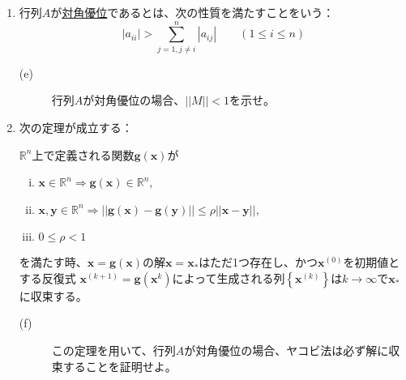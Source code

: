 \begin{enumerate}
\item 行列$A$が\underline{対角優位}であるとは、次の性質を満たすことをいう：
  \begin{equation*}
    |a_{ii}|>\sum_{j=1, j\neq i}^{n}\left|a_{ij}\right|\qquad (1\le i\le n)
  \end{equation*}
  \begin{description}
  \item[(e)] 行列$A$が対角優位の場合、$||M||<1$を示せ。
  \end{description}

\item 次の定理が成立する：
  \begin{screen}
    $\mathbb{R}^{n}$上で定義される関数$\mathbf{g}(\mathbf{x})$が
    \setlength{\leftmargini}{20pt}
    \begin{enumerate}[(i)]
    \item $\mathbf{x}\in\mathbb{R}^{n} \Longrightarrow \mathbf{g}(\mathbf{x})\in \mathbb{R}^{n}$,
    \item $\mathbf{x}, \mathbf{y}\in\mathbb{R}^{n}\Longrightarrow ||\mathbf{g}(\mathbf{x}) - \mathbf{g}(\mathbf{y})||\le \rho ||\mathbf{x}-\mathbf{y}||$,
    \item $0\le \rho < 1$
    \end{enumerate}
    を満たす時、$\mathbf{x}=\mathbf{g}(\mathbf{x})$の解$\mathbf{x}=\mathbf{x}_{*}$はただ1つ存在し、かつ$\mathbf{x}^{(0)}$を初期値とする反復式
    $\mathbf{x}^{(k+1)}=\mathbf{g}(\mathbf{x}^{k})$によって生成される列$\left\{\mathbf{x}^{(k)}\right\}$は$k\rightarrow\infty$で$\mathbf{x}_{*}$に収束する。
  \end{screen}

  \begin{description}
  \item[(f)] この定理を用いて、行列$A$が対角優位の場合、ヤコビ法は必ず解に収束することを証明せよ。
  \end{description}
  
\end{enumerate}
